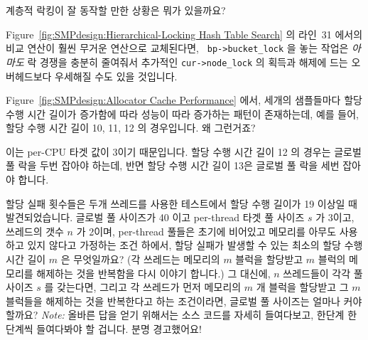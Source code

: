 \begin{enumerate}
\QuickQ{}
	계층적 락킹이 잘 동작할 만한 상황은 뭐가 있을까요?

\QuickA{}
	Figure~\ref{fig:SMPdesign:Hierarchical-Locking Hash Table Search} 의
	라인~31 에서의 비교 연산이 훨씬 무거운 연산으로 교체된다면, {\tt
	bp->bucket\_lock} 을 놓는 작업은 \emph{아마도} 락 경쟁을 충분히
	줄여줘서 추가적인 {\tt cur->node\_lock} 의 획득과 해제에 드는
	오버헤드보다 우세해질 수도 있을 것입니다.

\QuickQ{}
	Figure~\ref{fig:SMPdesign:Allocator Cache Performance} 에서, 세개의
	샘플들마다 할당 수행 시간 길이가 증가함에 따라 성능이 따라 증가하는
	패턴이 존재하는데, 예를 들어, 할당 수행 시간 길이 10, 11, 12 의
	경우입니다.
	왜 그런거죠?

\QuickA{}
	이는 per-CPU 타겟 값이 3이기 때문입니다.
	할당 수행 시간 길이 12 의 경우는 글로벌 풀 락을 두번 잡아야 하는데,
	반면 할당 수행 시간 길이 13은 글로벌 풀 락을 세번 잡아야 합니다.

\QuickQ{}
	할당 실패 횟수들은 두개 쓰레드를 사용한 테스트에서 할당 수행 길이가 19
	이상일 때 발견되었습니다.
	글로벌 풀 사이즈가 40 이고 per-thread 타겟 풀 사이즈 $s$ 가 3이고,
	쓰레드의 갯수 $n$ 가 2이며, per-thread 풀들은 초기에 비어있고 메모리를
	아무도 사용하고 있지 않다고 가정하는 조건 하에서, 할당 실패가 발생할 수
	있는 최소의 할당 수행 시간 길이 $m$ 은 무엇일까요?
	(각 쓰레드는 메모리의 $m$ 블럭을 할당받고 $m$ 블럭의 메모리를 해제하는
	것을 반복함을 다시 이야기 합니다.)
	그 대신에, $n$ 쓰레드들이 각각 풀 사이즈 $s$ 를 갖는다면, 그리고 각
	쓰레드가 먼저 메모리의 $m$ 개 블럭을 할당받고 그 $m$ 블럭들을 해제하는
	것을 반복한다고 하는 조건이라면, 글로벌 풀 사이즈는 얼마나 커야 할까요?
	\emph{Note:} 올바른 답을 얻기 위해서는  소스 코드를
	자세히 들여다보고, 한단계 한단계씩 들여다봐야 할 겁니다.
	분명 경고했어요!
	\iffalse


\end{enumerate}
